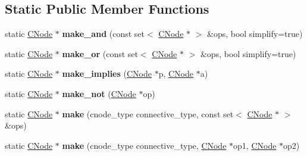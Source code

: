 \subsection*{\-Static \-Public \-Member \-Functions}
\begin{DoxyCompactItemize}
\item 
\hypertarget{classConnective_a9db2e5c1275ed1d7750ff42443642c5d}{static \hyperlink{classCNode}{\-C\-Node} $\ast$ {\bfseries make\-\_\-and} (const set$<$ \hyperlink{classCNode}{\-C\-Node} $\ast$ $>$ \&ops, bool simplify=true)}\label{classConnective_a9db2e5c1275ed1d7750ff42443642c5d}

\item 
\hypertarget{classConnective_a893b5c22ebdbc8f8729eccbf8044fff5}{static \hyperlink{classCNode}{\-C\-Node} $\ast$ {\bfseries make\-\_\-or} (const set$<$ \hyperlink{classCNode}{\-C\-Node} $\ast$ $>$ \&ops, bool simplify=true)}\label{classConnective_a893b5c22ebdbc8f8729eccbf8044fff5}

\item 
\hypertarget{classConnective_a2bfa7d0a5a2b483c951c2c141598544b}{static \hyperlink{classCNode}{\-C\-Node} $\ast$ {\bfseries make\-\_\-implies} (\hyperlink{classCNode}{\-C\-Node} $\ast$p, \hyperlink{classCNode}{\-C\-Node} $\ast$a)}\label{classConnective_a2bfa7d0a5a2b483c951c2c141598544b}

\item 
\hypertarget{classConnective_aa7a4c06828b2b006363505a6b467e5b0}{static \hyperlink{classCNode}{\-C\-Node} $\ast$ {\bfseries make\-\_\-not} (\hyperlink{classCNode}{\-C\-Node} $\ast$op)}\label{classConnective_aa7a4c06828b2b006363505a6b467e5b0}

\item 
\hypertarget{classConnective_a6d244aaf1e1f14cab26ea9d7d47d4995}{static \hyperlink{classCNode}{\-C\-Node} $\ast$ {\bfseries make} (cnode\-\_\-type connective\-\_\-type, const set$<$ \hyperlink{classCNode}{\-C\-Node} $\ast$ $>$ \&ops)}\label{classConnective_a6d244aaf1e1f14cab26ea9d7d47d4995}

\item 
\hypertarget{classConnective_a32888e60780cee951a359faef478c8d0}{static \hyperlink{classCNode}{\-C\-Node} $\ast$ {\bfseries make} (cnode\-\_\-type connective\-\_\-type, \hyperlink{classCNode}{\-C\-Node} $\ast$op1, \hyperlink{classCNode}{\-C\-Node} $\ast$op2)}\label{classConnective_a32888e60780cee951a359faef478c8d0}

\end{DoxyCompactItemize}
